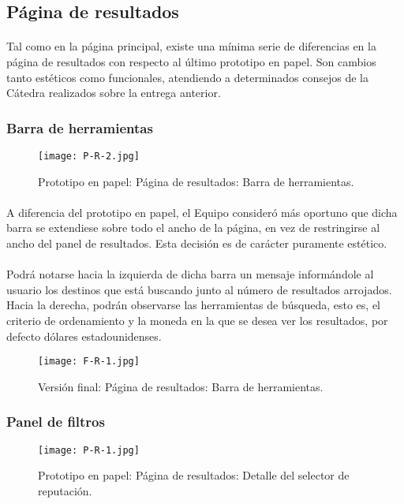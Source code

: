 \documentclass[spanish]{article}
\begin{document}
	\subsection{Página de resultados}
	\paragraph{} Tal como en la página principal, existe una mínima serie de diferencias en la página de resultados con respecto al último prototipo en papel. Son cambios tanto estéticos como funcionales, atendiendo a determinados consejos de la Cátedra realizados sobre la entrega anterior. 
	\subsubsection{Barra de herramientas} 
			\begin{figure}[h]
				\centering
				\texttt{[image: P-R-2.jpg]}
				\caption{Prototipo en papel: Página de resultados: Barra de herramientas.}
			\end{figure}
	\paragraph{} A diferencia del prototipo en papel, el Equipo consideró más oportuno que dicha barra se extendiese sobre todo el ancho de la página, en vez de restringirse al ancho del panel de resultados. Esta decisión es de carácter puramente estético. 
	\paragraph{} Podrá notarse hacia la izquierda de dicha barra un mensaje informándole al usuario los destinos que está buscando junto al número de resultados arrojados. Hacia la derecha, podrán observarse las herramientas de búsqueda, esto es, el criterio de ordenamiento y la moneda en la que se desea ver los resultados, por defecto dólares estadounidenses. 
			\begin{figure}[h]
				\centering
				\texttt{[image: F-R-1.jpg]}
				\caption{Versión final: Página de resultados: Barra de herramientas.}
			\end{figure}
	\subsubsection{Panel de filtros}
			\begin{figure}[h]
				\centering
				\texttt{[image: P-R-1.jpg]}
				\caption{Prototipo en papel: Página de resultados: Detalle del selector de reputación.}
			\end{figure}
\end{document}
